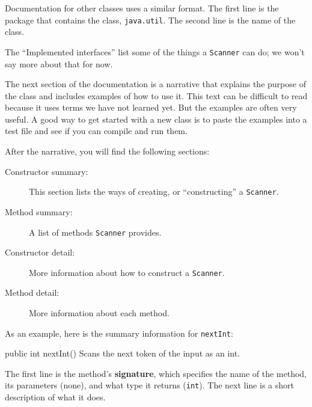 \documentclass[12pt]{book}
\theoremstyle{exercise}
\newcommand{\java}[1]{\verb"#1"}
\begin{document}
Documentation for other classes uses a similar format.
The first line is the package that contains the class, \java{java.util}.
The second line is the name of the class.


The ``Implemented interfaces'' list some of the things a \java{Scanner} can do; we won't say more about that for now.


The next section of the documentation is a narrative that explains the purpose of the class and includes examples of how to use it.
This text can be difficult to read because it uses terms we have not learned yet.
But the examples are often very useful.
A good way to get started with a new class is to paste the examples into a test file and see if you can compile and run them.

After the narrative, you will find the following sections:

\begin{description}

\item[Constructor summary:]
This section lists the ways of creating, or ``constructing'' a \java{Scanner}.

\item[Method summary:]
A list of methods \java{Scanner} provides.

\item[Constructor detail:]
More information about how to construct a \java{Scanner}.

\item[Method detail:]
More information about each method.

\end{description}

As an example, here is the summary information for \java{nextInt}:

\begin{stdout}
public int nextInt()
Scans the next token of the input as an int.
\end{stdout}


The first line is the method's {\bf signature}, which specifies the name of the method, its parameters (none), and what type it returns (\java{int}).
The next line is a short description of what it does.
\end{document}

